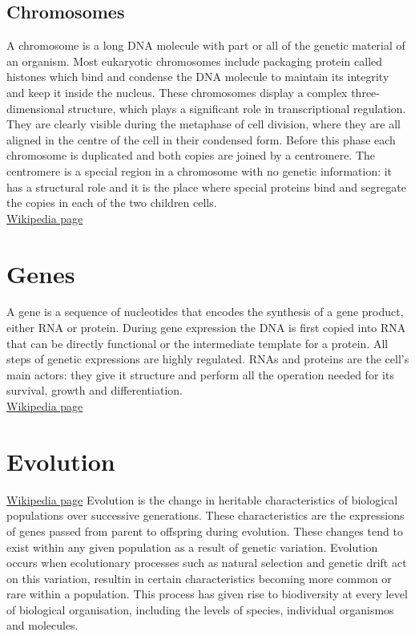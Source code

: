 \section{Chromosomes}
A chromosome is a long DNA molecule with part or all of the genetic material of an organism.
Most eukaryotic chromosomes include packaging protein called histones which bind and condense the DNA molecule to maintain its integrity and keep it inside the nucleus.
These chromosomes display a complex three-dimensional structure, which plays a significant role in transcriptional regulation.
They are clearly visible during the metaphase of cell division, where they are all aligned in the centre of the cell in their condensed form.
Before this phase each chromosome is duplicated and both copies are joined by a centromere.
The centromere is a special region in a chromosome with no genetic information: it has a structural role and it is the place where special proteins bind and segregate the copies in each of the two children cells.\\
\href{https://en.wikipedia.org/wiki/Chromosome}{Wikipedia page}
\chapter{Genes}
A gene is a sequence of nucleotides that encodes the synthesis of a gene product, either RNA or protein.
During gene expression the DNA is first copied into RNA that can be directly functional or the intermediate template for a protein.
All steps of genetic expressions are highly regulated.
RNAs and proteins are the cell's main actors: they give it structure and perform all the operation needed for its survival, growth and differentiation.\\
\href{https://en.wikipedia.org/wiki/Gene}{Wikipedia page}
\chapter{Evolution}
\href{https://en.wikipedia.org/wiki/Evolution}{Wikipedia page}
Evolution is the change in heritable characteristics of biological populations over successive generations.
These characteristics are the expressions of genes passed from parent to offspring during evolution.
These changes tend to exist within any given population as a result of genetic variation.
Evolution occurs when ecolutionary processes such as natural selection and genetic drift act on this variation, resultin in certain characteristics becoming more common or rare within a population.
This process has given rise to biodiversity at every level of biological organisation, including the levels of species, individual organismos and molecules.
